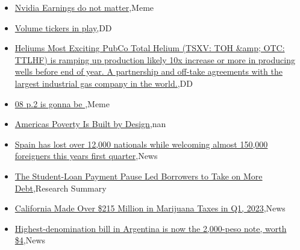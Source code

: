 \documentclass{article}%
\begin{document}
%
\begin{itemize}%
\item%
\href{https://reddit.com/r/wallstreetbets/comments/13qk0vw/nvidia\_earnings\_do\_not\_matter/}{Nvidia Earnings do not matter},Meme%
\item%
\href{https://reddit.com/r/wallstreetbets/comments/13qjy0l/volume\_tickers\_in\_play/}{Volume tickers in play},DD%
\item%
\href{https://reddit.com/r/Baystreetbets/comments/13psava/heliums\_most\_exciting\_pubco\_total\_helium\_tsxv\_toh/}{Heliums Most Exciting PubCo Total Helium (TSXV: TOH \&amp; OTC: TTLHF) is ramping up production  likely 10x increase or more in producing wells before end of year. A partnership and off-take agreements with the largest industrial gas company in the world.},DD%
\item%
\href{https://reddit.com/r/StockMarket/comments/13qc2rs/08\_p2\_is\_gonna\_be/}{08 p.2 is gonna be },Meme%
\item%
\href{https://reddit.com/r/Economics/comments/13q8al7/americas\_poverty\_is\_built\_by\_design/}{Americas Poverty Is Built by Design},nan%
\item%
\href{https://reddit.com/r/Economics/comments/13q304s/spain\_has\_lost\_over\_12000\_nationals\_while/}{Spain has lost over 12,000 nationals while welcoming almost 150,000 foreigners this years first quarter},News%
\item%
\href{https://reddit.com/r/Economics/comments/13q2gvg/the\_studentloan\_payment\_pause\_led\_borrowers\_to/}{The Student-Loan Payment Pause Led Borrowers to Take on More Debt},Research Summary%
\item%
\href{https://reddit.com/r/Economics/comments/13q1xsm/california\_made\_over\_215\_million\_in\_marijuana/}{California Made Over \$215 Million in Marijuana Taxes in Q1, 2023},News%
\item%
\href{https://reddit.com/r/Economics/comments/13puvxl/highestdenomination\_bill\_in\_argentina\_is\_now\_the/}{Highest-denomination bill in Argentina is now the 2,000-peso note, worth \$4},News%
\end{itemize}%
\end{document}
